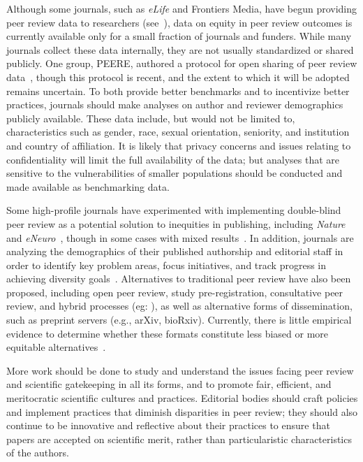 \documentclass[10pt,letterpaper]{article}
\begin{document}
Although some journals, such as \textit{eLife} and Frontiers Media, have begun providing peer review data to researchers (see~\cite{helmer_research:_2017, giordan_effects_2016}), data on equity in peer review outcomes is currently available only for a small fraction of journals and funders. While many journals collect these data internally, they are not usually standardized or shared publicly. One group, PEERE, authored a protocol for open sharing of peer review data~\cite{noauthor_peere_2017, squazzoni_publishing:_2017}, though this protocol is recent, and the extent to which it will be adopted remains uncertain. To both provide better benchmarks and to incentivize better practices, journals should make analyses on author and reviewer demographics publicly available. These data include, but would not be limited to, characteristics such as gender, race, sexual orientation, seniority, and institution and country of affiliation. It is likely that privacy concerns and issues relating to confidentiality will limit the full availability of the data; but analyses that are sensitive to the vulnerabilities of smaller populations should be conducted and made available as benchmarking data. 

Some high-profile journals have experimented with implementing double-blind peer review as a potential solution to inequities in publishing, including \textit{Nature}~\cite{noauthor_nature_2015} and \textit{eNeuro}~\cite{bernard_editorial:_2018}, though in some cases with mixed results~\cite{mcgillivray_uptake_2018}. In addition, journals are analyzing the demographics of their published authorship and editorial staff in order to identify key problem areas, focus initiatives, and track progress in achieving diversity goals~\cite{noauthor_natures_2018, lerback_journals_2017, valkonen_gender_2011}. Alternatives to traditional peer review have also been proposed, including open peer review, study pre-registration, consultative peer review, and hybrid processes (eg: \cite{pulverer_transparent_2010, o_faolean_frontiers_2016, merchant_plant_2016, pourquie_future_2016, rodgers_peer_2017, king_peer_2017}), as well as alternative forms of dissemination, such as preprint servers (e.g., arXiv, bioRxiv). Currently, there is little empirical evidence to determine whether these formats constitute less biased or more equitable alternatives~\cite{lee_bias_2013}.

More work should be done to study and understand the issues facing peer review and scientific gatekeeping in all its forms, and to promote fair, efficient, and meritocratic scientific cultures and practices. Editorial bodies should craft policies and implement practices that diminish disparities in peer review; they should also continue to be innovative and reflective about their practices to ensure that papers are accepted on scientific merit, rather than particularistic characteristics of the authors. 
\end{document}
